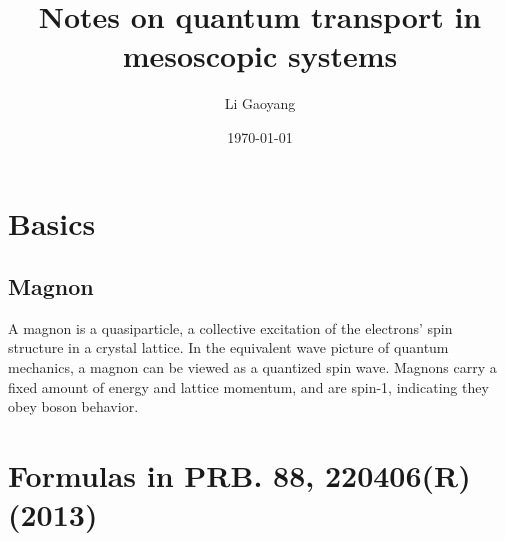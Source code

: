 \documentclass[11pt,a4paper]{article}
\begin{document}
\title{Notes on quantum transport in mesoscopic systems}
\author{Li Gaoyang}
\date{\today}
\maketitle


\section{Basics}
\subsection{Magnon}
A magnon is a quasiparticle, a collective excitation of the electrons' spin structure in a crystal lattice. In the equivalent wave picture of quantum mechanics, a magnon can be viewed as a quantized spin wave. Magnons carry a fixed amount of energy and lattice momentum, and are spin-1, indicating they obey boson behavior.
\section{Formulas in PRB. 88, 220406(R) (2013)}
\end{document}
